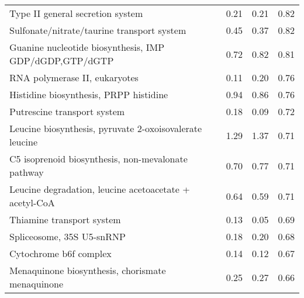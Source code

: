 \begin{landscape}
\begin{table}
\begin{center}
\begin{tabularx}{\linewidth}{Xlll}
Type II general secretion system & 0.21 & 0.21 & 0.82\\
Sulfonate/nitrate/taurine transport system & 0.45 & 0.37 & 0.82\\
Guanine nucleotide biosynthesis, IMP \textrightarrow{} GDP/dGDP,GTP/dGTP & 0.72 & 0.82 & 0.81\\
RNA polymerase II, eukaryotes & 0.11 & 0.20 & 0.76\\
Histidine biosynthesis, PRPP \textrightarrow{} histidine & 0.94 & 0.86 & 0.76\\
Putrescine transport system & 0.18 & 0.09 & 0.72\\
Leucine biosynthesis, pyruvate \textrightarrow{} 2-oxoisovalerate \textrightarrow{} leucine & 1.29 & 1.37 & 0.71\\
C5 isoprenoid biosynthesis, non-mevalonate pathway & 0.70 & 0.77 & 0.71\\
Leucine degradation, leucine \textrightarrow{} acetoacetate + acetyl-CoA & 0.64 & 0.59 & 0.71\\
Thiamine transport system & 0.13 & 0.05 & 0.69\\
Spliceosome, 35S U5-snRNP & 0.18 & 0.20 & 0.68\\
Cytochrome b6f complex & 0.14 & 0.12 & 0.67\\
Menaquinone biosynthesis, chorismate \textrightarrow{} menaquinone & 0.25 & 0.27 & 0.66\\
\bottomrule
\end{tabularx}
\end{center}
\end{table}
\end{landscape}
